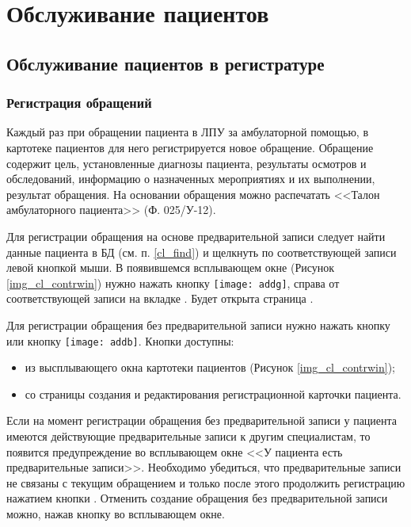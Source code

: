 \newpage
\section{Обслуживание пациентов}
{
\subsection{Обслуживание пациентов в регистратуре}
\subsubsection {Регистрация обращений} \label{pol_obr}

Каждый раз при обращении пациента в ЛПУ за амбулаторной помощью, в картотеке пациентов для него регистрируется новое обращение. Обращение содержит цель, установленные диагнозы пациента, результаты осмотров и обследований, информацию о назначенных мероприятиях и их выполнении, результат обращения. На основании обращения можно распечатать <<Талон амбулаторного пациента>> (Ф. 025\slash У-12).

Для регистрации обращения на основе предварительной записи следует найти данные пациента в БД (см. п. \ref{cl_find}) и щелкнуть по соответствующей записи левой кнопкой мыши. В появившемся всплывающем окне (Рисунок \ref{img_cl_contrwin}) нужно нажать кнопку \texttt{[image: addg]}, справа от соответствующей записи на вкладке . Будет открыта страница .

Для регистрации обращения без предварительной записи нужно нажать кнопку  или кнопку \texttt{[image: addb]}. Кнопки доступны:
\begin{itemize}
 \item из высплывающего окна картотеки пациентов (Рисунок \ref{img_cl_contrwin});
 \item со страницы создания и редактирования регистрационной карточки пациента. 
\end{itemize}

Если на момент регистрации обращения без предварительной записи у пациента имеются действующие предварительные записи к другим специалистам, то появится предупреждение во всплывающем окне <<У пациента есть предварительные записи>>. Необходимо убедиться, что предварительные записи не связаны с текущим обращением и только после этого продолжить регистрацию нажатием кнопки . Отменить создание обращения без предварительной записи можно, нажав кнопку   во всплывающем окне.

}
